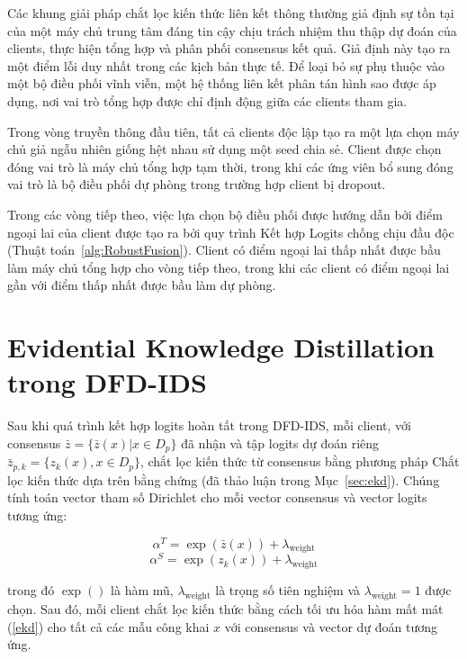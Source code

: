 Các khung giải pháp chắt lọc kiến thức liên kết thông thường giả định sự tồn tại của một máy chủ trung tâm đáng tin cậy chịu trách nhiệm thu thập dự đoán của clients, thực hiện tổng hợp và phân phối consensus kết quả. Giả định này tạo ra một điểm lỗi duy nhất trong các kịch bản thực tế. Để loại bỏ sự phụ thuộc vào một bộ điều phối vĩnh viễn, một hệ thống liên kết phân tán hình sao được áp dụng, nơi vai trò tổng hợp được chỉ định động giữa các clients tham gia.

Trong vòng truyền thông đầu tiên, tất cả clients độc lập tạo ra một lựa chọn máy chủ giả ngẫu nhiên giống hệt nhau sử dụng một seed chia sẻ. Client được chọn đóng vai trò là máy chủ tổng hợp tạm thời, trong khi các ứng viên bổ sung đóng vai trò là bộ điều phối dự phòng trong trường hợp client bị dropout.

Trong các vòng tiếp theo, việc lựa chọn bộ điều phối được hướng dẫn bởi điểm ngoại lai của client được tạo ra bởi quy trình Kết hợp Logits chống chịu đầu độc (Thuật toán~\ref{alg:RobustFusion}). Client có điểm ngoại lai thấp nhất được bầu làm máy chủ tổng hợp cho vòng tiếp theo, trong khi các client có điểm ngoại lai gần với điểm thấp nhất được bầu làm dự phòng.

\section{Evidential Knowledge Distillation trong DFD-IDS}
\label{sec:ekd_dfdids}

Sau khi quá trình kết hợp logits hoàn tất trong DFD-IDS, mỗi client, với consensus $\bar{z} = \{\bar{z}(x)|x \in D_p\}$ đã nhận và tập logits dự đoán riêng $\bar z_{p,k} = \{z_k(x), x \in D_p\}$, chắt lọc kiến thức từ consensus bằng phương pháp Chắt lọc kiến thức dựa trên bằng chứng (đã thảo luận trong Mục~\ref{sec:ekd}). Chúng tính toán vector tham số Dirichlet cho mỗi vector consensus và vector logits tương ứng:

$$\alpha^T = \exp(\bar z(x)) + \lambda_{\text{weight}}$$
$$\alpha^S = \exp(z_k(x)) + \lambda_{\text{weight}}$$

trong đó $\exp()$ là hàm mũ, $\lambda_{\text{weight}}$ là trọng số tiên nghiệm và $\lambda_{\text{weight}}=1$ được chọn. Sau đó, mỗi client chắt lọc kiến thức bằng cách tối ưu hóa hàm mất mát (\ref{ekd}) cho tất cả các mẫu công khai $x$ với consensus và vector dự đoán tương ứng.

